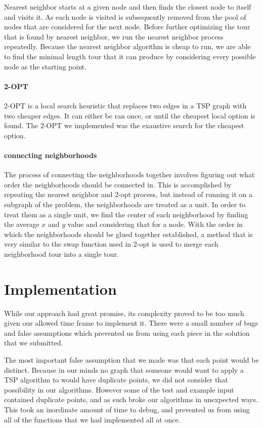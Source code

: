 \documentclass[12pt]{article}
\begin{document}
Nearest neighbor starts at a given node and then finds the closest node to
itself and visits it. As each node is visited is subsequently removed from the
pool of nodes that are considered for the next node. Before further optimizing
the tour that is found by nearest neighbor, we run the nearest neighbor process
repeatedly. Because the nearest neighbor algorithm is cheap to run, we are able
to find the minimal length tour that it can produce by considering every
possible node as the starting point. 

\paragraph{2-OPT}

2-OPT is a local search heuristic that replaces two edges in a TSP graph
with two cheaper edges. It can either be ran once, or until the cheapest
local option is found. The 2-OPT we implemented was the exaustive search
for the cheapest option.

\paragraph{connecting neighborhoods}

The process of connecting the neighborhoods together involves figuring out what
order the neighborhoods should be connected in. This is accomplished by
repeating the nearest neighbor and 2-opt process, but instead of running it on
a subgraph of the problem, the neighborhoods are treated as a unit.  In order
to treat them as a single unit, we find the center of each neighborhood by
finding the average $x$ and $y$ value and considering that for a node.  With
the order in which the neighborhoods should be glued together established, a
method that is very similar to the swap function used in 2-opt is used to merge
each neighborhood tour into a single tour.


\section*{Implementation}

While our approach had great promise, its complexity proved to be too much
given our allowed time frame to implement it.  There were a small number of
bugs and false assumptions which prevented us from using each piece in the
solution that we submitted.

The most important false assumption that we made was that each point would be
distinct.  Because in our minds no graph that someone would want to apply a TSP
algorithm to would have duplicate points, we did not consider that possibility
in our algorithms.  However some of the test and example input contained
duplicate points, and as such broke our algorithms in unexpected ways.  This
took an inordinate amount of time to debug, and prevented us from using all of
the functions that we had implemented all at once.
\end{document}
